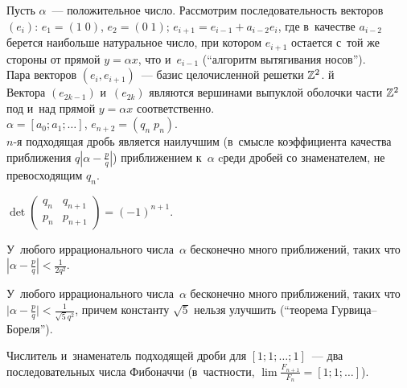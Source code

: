 \documentclass[a4paper, 12pt]{article}
\def\mtrx#1#2#3#4{\begin{pmatrix}#1 & #2 \\ #3 & #4\end{pmatrix}}
\def\vctr#1#2{(#1\;#2)}
\begin{document}
Пусть $\alpha$~--- положительное число. Рассмотрим последовательность векторов $(e_i)$: $e_1=\vctr10$, $e_2=\vctr01$; $e_{i+1}=e_{i-1}+a_{i-2}e_i$, где в~качестве $a_{i-2}$ берется наибольше натуральное число, при котором $e_{i+1}$ остается с~той же стороны от прямой $y=\alpha x$, что и~$e_{i-1}$ (``алгоритм вытягивания носов'').
\\ Пара векторов $(e_i,e_{i+1})$~--- базис целочисленной решетки $\mathbb{Z}^2$.
й\\ Вектора $(e_{2k-1})$ и~$(e_{2k})$ являются вершинами выпуклой оболочки части $\mathbb{Z}^2$ под и~над прямой $y=\alpha x$ соответственно.
\\ $\alpha=[a_0;a_1;\ldots]$, $e_{n+2}=\vctr{q_n}{p_n}$.
\\ $n$-я подходящая дробь является наилучшим (в~смысле коэффициента качества приближения $q|\alpha-\frac pq|$) приближением к~$\alpha$ cреди дробей со знаменателем, не превосходящим $q_n$.





\vspace{-6pt}
 $\det\mtrx{q_n}{q_{n+1}}{p_n}{p_{n+1}}=(-1)^{n+1}$.

 У~любого иррационального числа~$\alpha$ бесконечно много приближений, таких что $|\alpha-\frac pq|<\frac1{2q^2}$. %













У~любого иррационального числа~$\alpha$ бесконечно много приближений, таких что $\bigl|\alpha-\frac pq\bigr|<\frac1{\sqrt5q^2}$, причем константу $\sqrt5$ нельзя улучшить (``теорема Гурвица--Бореля'').






Числитель и~знаменатель подходящей дроби для $[1;1;\ldots;1]$~--- два последовательных числа Фибоначчи (в~частности, $\lim\frac{F_{n+1}}{F_n}=[1;1;\ldots]$).
\end{document}
